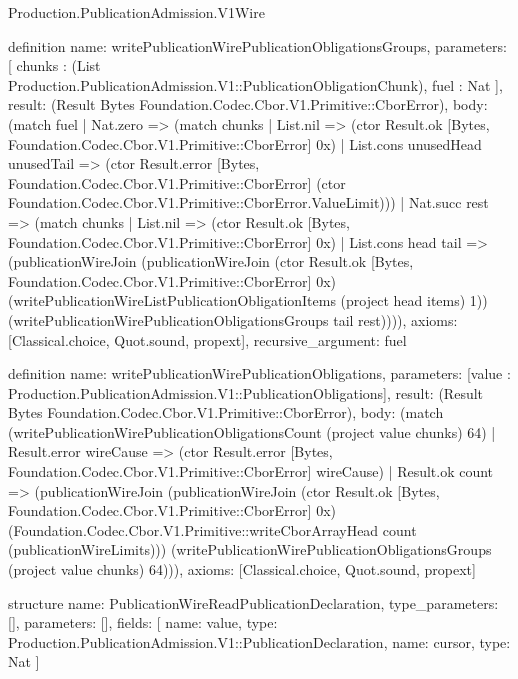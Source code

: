 \begin{lexlean}{Production.PublicationAdmission.V1Wire}
\begin{semanticmodule}
definition{
  name: writePublicationWirePublicationObligationsGroups,
  parameters: [
    chunks : (List Production.PublicationAdmission.V1::PublicationObligationChunk),
    fuel : Nat
  ],
  result: (Result Bytes Foundation.Codec.Cbor.V1.Primitive::CborError),
  body: (match fuel
    | Nat.zero => (match chunks
      | List.nil => (ctor Result.ok [Bytes, Foundation.Codec.Cbor.V1.Primitive::CborError] 0x)
      | List.cons unusedHead unusedTail => (ctor Result.error [Bytes, Foundation.Codec.Cbor.V1.Primitive::CborError] (ctor Foundation.Codec.Cbor.V1.Primitive::CborError.ValueLimit)))
    | Nat.succ rest => (match chunks
      | List.nil => (ctor Result.ok [Bytes, Foundation.Codec.Cbor.V1.Primitive::CborError] 0x)
      | List.cons head tail => (publicationWireJoin (publicationWireJoin (ctor Result.ok [Bytes, Foundation.Codec.Cbor.V1.Primitive::CborError] 0x) (writePublicationWireListPublicationObligationItems (project head items) 1)) (writePublicationWirePublicationObligationsGroups tail rest)))),
  axioms: [Classical.choice, Quot.sound, propext],
  recursive_argument: fuel
}

definition{
  name: writePublicationWirePublicationObligations,
  parameters: [value : Production.PublicationAdmission.V1::PublicationObligations],
  result: (Result Bytes Foundation.Codec.Cbor.V1.Primitive::CborError),
  body: (match (writePublicationWirePublicationObligationsCount (project value chunks) 64)
    | Result.error wireCause => (ctor Result.error [Bytes, Foundation.Codec.Cbor.V1.Primitive::CborError] wireCause)
    | Result.ok count => (publicationWireJoin (publicationWireJoin (ctor Result.ok [Bytes, Foundation.Codec.Cbor.V1.Primitive::CborError] 0x) (Foundation.Codec.Cbor.V1.Primitive::writeCborArrayHead count (publicationWireLimits))) (writePublicationWirePublicationObligationsGroups (project value chunks) 64))),
  axioms: [Classical.choice, Quot.sound, propext]
}

structure{
  name: PublicationWireReadPublicationDeclaration,
  type_parameters: [],
  parameters: [],
  fields: [
    {name: value, type: Production.PublicationAdmission.V1::PublicationDeclaration},
    {name: cursor, type: Nat}
  ]
}


\end{semanticmodule}
\end{lexlean}
